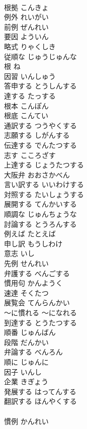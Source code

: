 \documentclass[8pt]{extreport}
\begin{document}
\begin{CJK}{UTF8}{min}
\\	根拠	こんきょ	
\\	例外	れいがい	
\\	前例	ぜんれい	
\\	要因	よういん	
\\	略式	りゃくしき	
\\	従順な	じゅうじゅんな	
\\	根	ね	
\\	因習	いんしゅう	
\\	答申する	とうしんする	
\\	達する	たっする	
\\	根本	こんぽん	
\\	根底	こんてい	
\\	通訳する	つうやくする	
\\	志願する	しがんする	
\\	伝達する	でんたつする	
\\	志す	こころざす	
\\	上達する	じょうたつする	
\\	大阪弁	おおさかべん	
\\	言い訳する	いいわけする	
\\	対照する	たいしょうする	
\\	展開する	てんかいする	
\\	順調な	じゅんちょうな	
\\	討論する	とうろんする	
\\	例えば	たとえば	
\\	申し訳	もうしわけ	
\\	意志	いし	
\\	先例	せんれい	
\\	弁護する	べんごする	
\\	慣用句	かんようく	
\\	速達	そくたつ	
\\	展覧会	てんらんかい	
\\	～に慣れる	～になれる	
\\	到達する	とうたつする	
\\	順番	じゅんばん	
\\	段階	だんかい	
\\	弁論する	べんろん	
\\	順に	じゅんに	
\\	因子	いんし	
\\	企業	きぎょう	
\\	発展する	はってんする	
\\	翻訳する	ほんやくする	
\\	[漢語]
\\	慣例	かんれい	

\end{CJK}
\end{document}
